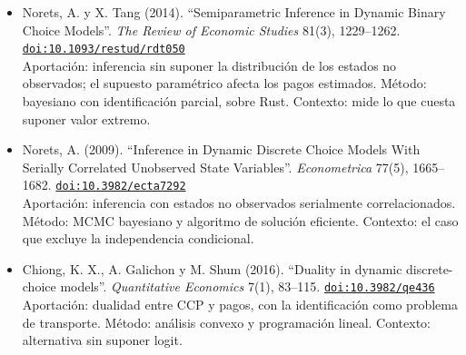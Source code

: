 \documentclass[11pt]{article}
\begin{document}
\begin{itemize}
Aportación: identificación con paneles cortos y sin datos del futuro. Método: teoría. Contexto: pertinente porque tu panel Monte Carlo tiene pocos años.
\item Norets, A. y X. Tang (2014). ``Semiparametric Inference in Dynamic Binary Choice Models''. \textit{The Review of Economic Studies} 81(3), 1229--1262. \href{https://doi.org/10.1093/restud/rdt050}{\texttt{doi:10.1093/restud/rdt050}}\\
Aportación: inferencia sin suponer la distribución de los estados no observados; el supuesto paramétrico afecta los pagos estimados. Método: bayesiano con identificación parcial, sobre Rust. Contexto: mide lo que cuesta suponer valor extremo.
\item Norets, A. (2009). ``Inference in Dynamic Discrete Choice Models With Serially Correlated Unobserved State Variables''. \textit{Econometrica} 77(5), 1665--1682. \href{https://doi.org/10.3982/ecta7292}{\texttt{doi:10.3982/ecta7292}}\\
Aportación: inferencia con estados no observados serialmente correlacionados. Método: MCMC bayesiano y algoritmo de solución eficiente. Contexto: el caso que excluye la independencia condicional.
\item Chiong, K. X., A. Galichon y M. Shum (2016). ``Duality in dynamic discrete-choice models''. \textit{Quantitative Economics} 7(1), 83--115. \href{https://doi.org/10.3982/qe436}{\texttt{doi:10.3982/qe436}}\\
Aportación: dualidad entre CCP y pagos, con la identificación como problema de transporte. Método: análisis convexo y programación lineal. Contexto: alternativa sin suponer logit.
\end{itemize}
\end{document}

